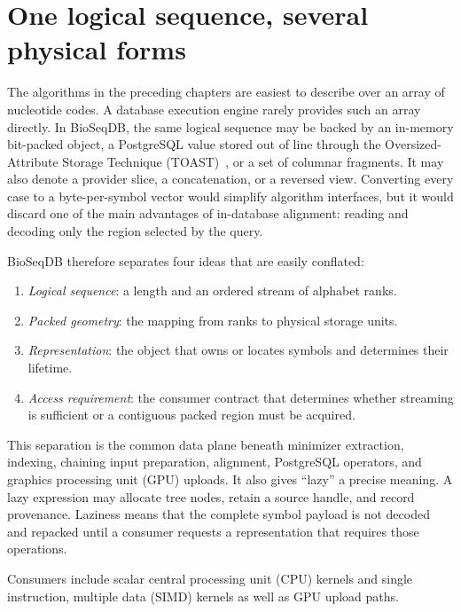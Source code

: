 \section{One logical sequence, several physical forms}
\label{sec:sequence-abstractions}

The algorithms in the preceding chapters are easiest to describe over an array
of nucleotide codes.  A database execution engine rarely provides such an
array directly.  In \mbox{BioSeqDB}, the same logical sequence may be backed by an
in-memory bit-packed object, a PostgreSQL value stored out of line through the
Oversized-Attribute Storage Technique (TOAST)~\cite{postgresql17_toast}, or a
set of columnar fragments.  It may also denote a provider slice, a
concatenation, or a reversed view.  Converting every case to a byte-per-symbol
vector would simplify algorithm interfaces, but it would discard one of the
main advantages of in-database alignment: reading and decoding only the region
selected by the query.

\mbox{BioSeqDB} therefore separates four ideas that are easily conflated:

\begin{enumerate}
    \item \emph{Logical sequence}: a length and an ordered stream of alphabet
    ranks.
    \item \emph{Packed geometry}: the mapping from ranks to physical storage
    units.
    \item \emph{Representation}: the object that owns or locates symbols and
    determines their lifetime.
    \item \emph{Access requirement}: the consumer contract that determines
    whether streaming is sufficient or a contiguous packed region must be
    acquired.
\end{enumerate}

This separation is the common data plane beneath minimizer extraction,
indexing, chaining input preparation, alignment, PostgreSQL operators, and
graphics processing unit (GPU) uploads.  It also gives ``lazy'' a precise
meaning.  A lazy expression may allocate tree nodes, retain a source handle,
and record provenance.  Laziness means that the complete symbol payload is not
decoded and repacked until a consumer requests a representation that requires
those operations.

Consumers include scalar central processing unit (CPU) kernels and
single instruction, multiple data (SIMD) kernels as well as GPU upload paths.

